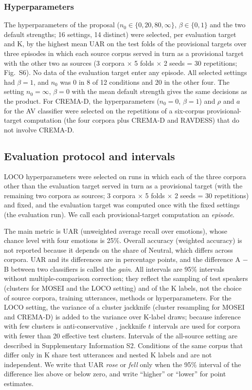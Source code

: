 \subsubsection{Hyperparameters}\label{sec:hp}
The hyperparameters of the proposal ($n_0\in\{0,20,80,\infty\}$, $\beta\in\{0,1\}$ and the two default strengths; 16 settings, 14 distinct) were selected, per evaluation target and K, by the highest mean UAR on the test folds of the provisional targets over three episodes in which each source corpus served in turn as a provisional target with the other two as sources (3 corpora $\times$ 5 folds $\times$ 2 seeds = 30 repetitions; Fig.~S6). No data of the evaluation target enter any episode. All selected settings had $\beta=1$, and $n_0$ was 0 in 8 of 12 conditions and 20 in the other four. The setting $n_0=\infty$, $\beta=0$ with the mean default strength gives the same decisions as the product. For CREMA-D, the hyperparameters ($n_0=0$, $\beta=1$) and $\rho$ and $a$ for the AV classifier were selected on the repetitions of a six-corpus provisional-target computation (the four corpora plus CREMA-D and RAVDESS) that do not involve CREMA-D.

\subsection{Evaluation protocol and intervals}\label{sec:protocol}
LOCO hyperparameters were selected on runs in which each of the three corpora other than the evaluation target served in turn as a provisional target (with the remaining two corpora as sources; 3 corpora $\times$ 5 folds $\times$ 2 seeds = 30 repetitions) and fixed, and the evaluation target was computed once with the fixed settings (the evaluation run). We call each provisional-target computation an \emph{episode}.

The main metric is UAR (unweighted average recall over emotions), whose chance level with four emotions is 25\%. Overall accuracy (weighted accuracy) is not reported because it depends on the share of Neutral, which differs across corpora. UAR and its differences are in percentage points, and the difference A $-$ B between two classifiers is called the \emph{gain}. All intervals are 95\% intervals without multiple-comparison correction; they reflect the sampling of test speakers (clusters for MOSEI and the LOCO setting) and of the K labels, not the choice of source corpora, training utterances, methods or hyperparameters. For the LOCO setting, the variance of a cluster jackknife (cluster resampling for MOSEI and CREMA-D) is added to the variance over K-label draws; because inference with few clusters is anti-conservative \cite{cameron2008}, jackknife $t$ intervals are used for corpora with fewer than 20 effective test clusters. Intervals of the all-source setting are described in Supplementary Information S2. Conditions of the same corpus that differ only in K share test utterances and nested K labels and are not independent. We write that UAR \emph{rose} or \emph{fell} only when the 95\% interval of the difference lies above or below zero, and write ``higher'' or ``lower'' for point estimates.

